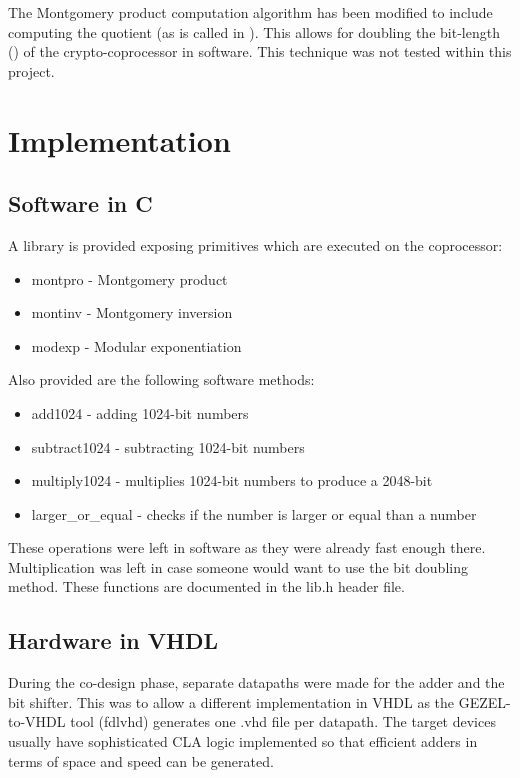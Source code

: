 The Montgomery product computation algorithm has been modified to
include computing the quotient (as is called in
\cite{monpro_doubling}). This allows for doubling the bit-length
(\cite{monpro_doubling, classic_doubling}) of the crypto-coprocessor
in software. This technique was not tested within this project.

\section{Implementation}

\subsection{Software in C}

A library is provided exposing primitives which are executed on the
coprocessor:
\begin{itemize}
\item montpro - Montgomery product
\item montinv - Montgomery inversion
\item modexp - Modular exponentiation
\end{itemize}

\noindent
Also provided are the following software methods:
\begin{itemize}
\item add1024 - adding 1024-bit numbers
\item subtract1024 - subtracting 1024-bit numbers
\item multiply1024 - multiplies 1024-bit numbers to produce a 2048-bit
\item larger\_or\_equal - checks if the number is larger or equal than a number
\end{itemize}

These operations were left in software as they were already fast
enough there. Multiplication was left in case someone would want to
use the bit doubling method. These functions are documented in the
lib.h header file.

\subsection{Hardware in VHDL}

During the co-design phase, separate datapaths were made for the adder
and the bit shifter.  This was to allow a different implementation in
VHDL as the GEZEL-to-VHDL tool (fdlvhd) generates one .vhd file per
datapath. The target devices usually have sophisticated CLA logic
implemented so that efficient adders in terms of space and speed can
be generated.

